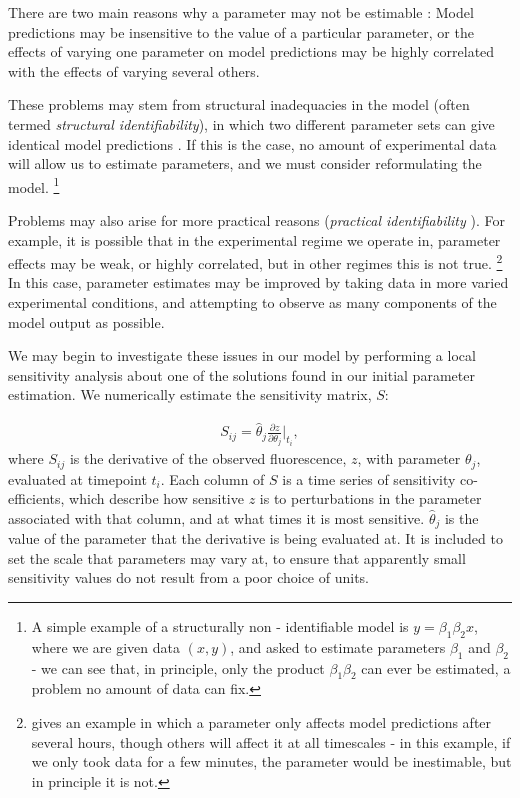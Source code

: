 \documentclass[10pt,journal]{./IEEE_latex_class/IEEEtran}
\begin{document}
 There are two main reasons why a parameter may not be estimable \cite{Mclean2012,Yao2003, Beck}: Model predictions may be insensitive to the value of a particular parameter, or the effects of varying one parameter on model predictions may be highly correlated with the effects of varying several others.
 
These problems may stem from structural inadequacies in the model (often termed \textit{structural identifiability}), in which two different parameter sets can give identical model predictions \cite{Jimenez-Hornero2008,Grewal1976 }. If this is the case, no amount of experimental data will allow us to estimate parameters, and we must consider reformulating the model. \footnote{A simple example of a structurally non - identifiable model is $y = \beta_{1}\beta_{2}x$, where we are given data $(x,y)$, and asked to estimate parameters $\beta_{1}$ and $\beta_{2}$ - we can see that, in principle, only the product $\beta_{1}\beta_{2}$ can ever be estimated, a problem no amount of data can fix.}

Problems may also arise for more practical reasons (\textit{practical identifiability} \cite{Mclean2012}). For example, it is possible that in the experimental regime we operate in, parameter effects may be weak, or highly correlated, but in other regimes this is not true. \footnote{\cite{Beck} gives an example in which a parameter only affects model predictions after several hours, though others will affect it at all timescales - in this example, if we only took data for a few minutes, the parameter would be inestimable, but in principle it is not.} In this case, parameter estimates may be improved by taking data in more varied experimental conditions, and attempting to observe as many components of the model output as possible. 
 
 We may begin to investigate these issues in our model by performing a local sensitivity analysis about one of the solutions found in our initial parameter estimation. We numerically estimate the sensitivity matrix, $S$:
 
 \begin{align}
S_{ij} = \hat{\theta}_{j} \frac{\partial z}{ \partial \theta_{j}}\Bigr|_{t_{i}},
\end{align}
where $S_{ij}$ is the derivative of the observed fluorescence, $z$, with parameter $\theta_{j}$, evaluated at timepoint $t_{i}$. Each column of $S$ is a time series of sensitivity co-efficients, which describe how sensitive $z$ is to perturbations in the parameter associated with that column, and at what times it is most sensitive. $\hat{\theta}_{j}$ is the value of the parameter that the derivative is being evaluated at. It is included to set the scale that parameters may vary at, to ensure that apparently small sensitivity values do not result from a poor choice of units.
\end{document}
